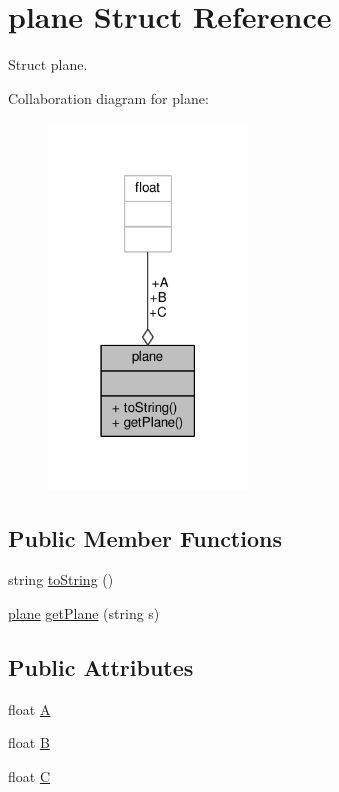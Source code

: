 \hypertarget{structplane}{}\section{plane Struct Reference}
\label{structplane}


Struct plane.  




Collaboration diagram for plane\+:
\nopagebreak
\begin{figure}[H]
\begin{center}
\leavevmode
\includegraphics[width=150pt]{structplane__coll__graph}
\end{center}
\end{figure}
\subsection*{Public Member Functions}
\begin{DoxyCompactItemize}
\item 
string \hyperlink{structplane_a1a13999da709be0884b258871749094b}{to\+String} ()
\item 
\hyperlink{structplane}{plane} \hyperlink{structplane_a88a050d1c95ab55513c8c9f55a666d14}{get\+Plane} (string s)
\end{DoxyCompactItemize}
\subsection*{Public Attributes}
\begin{DoxyCompactItemize}
\item 
float \hyperlink{structplane_a7cbe59df743ed3cf5b914b94e5d8ae52}{A}
\item 
float \hyperlink{structplane_a03abeea8dacf60d86309aa336269906f}{B}
\item 
float \hyperlink{structplane_a88b564304a3acb0f68186e2ea71a0cdc}{C}
\end{DoxyCompactItemize}


